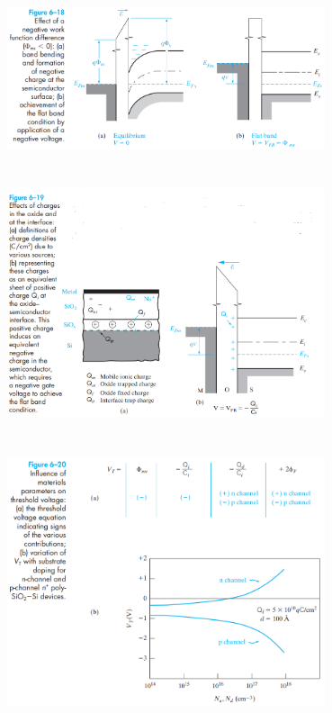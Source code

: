\documentclass[8pt]{article}
\newcommand{\hl}{\noindent\makebox[\linewidth]{\rule{\textwidth}{0.2pt}}}
\begin{document}
\begin{center}
		\includegraphics[width=0.7\textwidth]{fig6-18} \\ \hl \\~\\
		\includegraphics[width=0.7\textwidth]{fig6-19} \\ \hl \\~\\
		\includegraphics[width=0.7\textwidth]{fig6-20} \\ \hl \\~\\

\end{center}
\end{document}
